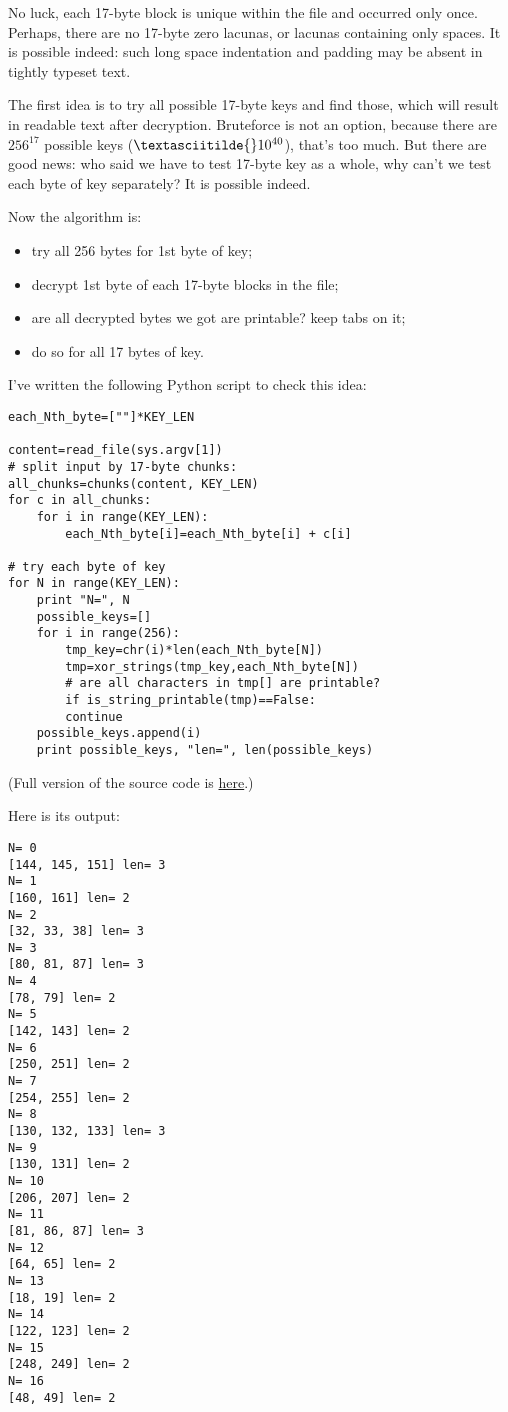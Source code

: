 No luck, each 17-byte block is unique within the file and occurred only once.
Perhaps, there are no 17-byte zero lacunas, or lacunas containing only spaces.
It is possible indeed: such long space indentation and padding may be absent in tightly typeset text.

The first idea is to try all possible 17-byte keys and find those, which will result in readable text after decryption.
Bruteforce is not an option, because there are $256^{17}$ possible keys ($\textasciitilde{}10^{40}$), that's too much.
But there are good news: who said we have to test 17-byte key as a whole, why can't we test each byte of key separately?
It is possible indeed.

Now the algorithm is:

\begin{itemize}
\item try all 256 bytes for 1st byte of key;
\item decrypt 1st byte of each 17-byte blocks in the file;
\item are all decrypted bytes we got are printable? keep tabs on it;
\item do so for all 17 bytes of key.
\end{itemize}

I've written the following Python script to check this idea:

\begin{lstlisting}[caption=Python script,style=custompy]
each_Nth_byte=[""]*KEY_LEN

content=read_file(sys.argv[1])
# split input by 17-byte chunks:
all_chunks=chunks(content, KEY_LEN)
for c in all_chunks:
    for i in range(KEY_LEN):
        each_Nth_byte[i]=each_Nth_byte[i] + c[i]

# try each byte of key
for N in range(KEY_LEN):
    print "N=", N
    possible_keys=[]
    for i in range(256):
        tmp_key=chr(i)*len(each_Nth_byte[N])
        tmp=xor_strings(tmp_key,each_Nth_byte[N])
        # are all characters in tmp[] are printable?
        if is_string_printable(tmp)==False:
	    continue
	possible_keys.append(i)
    print possible_keys, "len=", len(possible_keys)
\end{lstlisting}

(Full version of the source code is \href{https://github.com/DennisYurichev/RE-for-beginners/blob/master/ff/XOR/mask_2/files/decrypt2.py}{here}.)

Here is its output:

\begin{lstlisting}
N= 0
[144, 145, 151] len= 3
N= 1
[160, 161] len= 2
N= 2
[32, 33, 38] len= 3
N= 3
[80, 81, 87] len= 3
N= 4
[78, 79] len= 2
N= 5
[142, 143] len= 2
N= 6
[250, 251] len= 2
N= 7
[254, 255] len= 2
N= 8
[130, 132, 133] len= 3
N= 9
[130, 131] len= 2
N= 10
[206, 207] len= 2
N= 11
[81, 86, 87] len= 3
N= 12
[64, 65] len= 2
N= 13
[18, 19] len= 2
N= 14
[122, 123] len= 2
N= 15
[248, 249] len= 2
N= 16
[48, 49] len= 2
\end{lstlisting}

